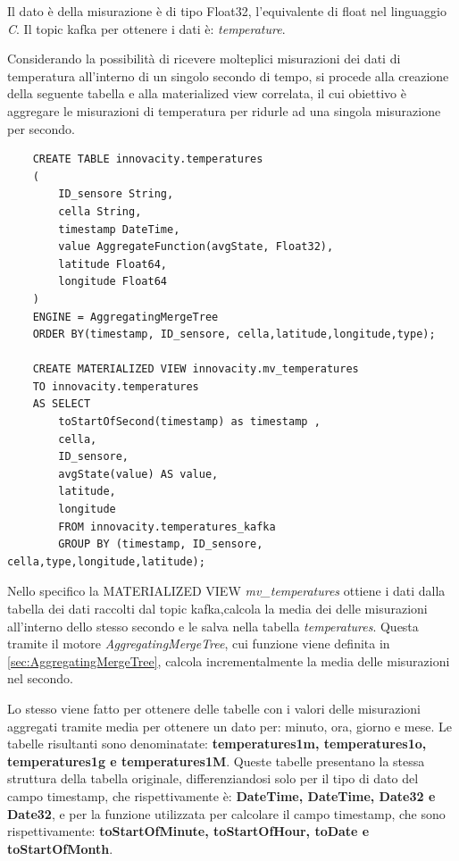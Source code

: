 Il dato è della misurazione è di tipo Float32, l'equivalente di float nel linguaggio \textit{C}.
Il topic kafka per ottenere i dati è: \textit{temperature}.

Considerando la possibilità di ricevere molteplici misurazioni dei dati di temperatura all'interno di un singolo secondo di tempo, si procede alla creazione della seguente tabella e alla materialized view correlata, il cui obiettivo è aggregare le misurazioni di temperatura per ridurle ad una singola misurazione per secondo.

\begin{verbatim}
    CREATE TABLE innovacity.temperatures
    (
        ID_sensore String,
        cella String,
        timestamp DateTime,
        value AggregateFunction(avgState, Float32),
        latitude Float64,
        longitude Float64
    )
    ENGINE = AggregatingMergeTree
    ORDER BY(timestamp, ID_sensore, cella,latitude,longitude,type);
    
    CREATE MATERIALIZED VIEW innovacity.mv_temperatures
    TO innovacity.temperatures
    AS SELECT
        toStartOfSecond(timestamp) as timestamp ,
        cella,
        ID_sensore,
        avgState(value) AS value,
        latitude,
        longitude
        FROM innovacity.temperatures_kafka
        GROUP BY (timestamp, ID_sensore, cella,type,longitude,latitude);
    \end{verbatim}

    Nello specifico la MATERIALIZED VIEW \textit{mv\_temperatures} ottiene i dati dalla tabella dei dati raccolti dal topic kafka,calcola la media dei delle misurazioni all'interno dello stesso secondo e le salva nella tabella \textit{temperatures}.
    Questa tramite il motore \textit{AggregatingMergeTree}, cui funzione viene definita in \ref*{sec:AggregatingMergeTree}, calcola incrementalmente la media delle misurazioni nel secondo.

    Lo stesso viene fatto per ottenere delle tabelle con i valori delle misurazioni aggregati tramite media per ottenere un dato per: minuto, ora, giorno e mese.
    Le tabelle risultanti sono denominatate: \textbf{temperatures1m, temperatures1o, temperatures1g e temperatures1M}. Queste tabelle presentano la stessa struttura della tabella originale, differenziandosi solo per il tipo di dato del campo timestamp, che rispettivamente è: \textbf{DateTime, DateTime, Date32 e Date32}, e per la funzione utilizzata per calcolare il campo timestamp, che sono rispettivamente: \textbf{toStartOfMinute, toStartOfHour, toDate e toStartOfMonth}.

